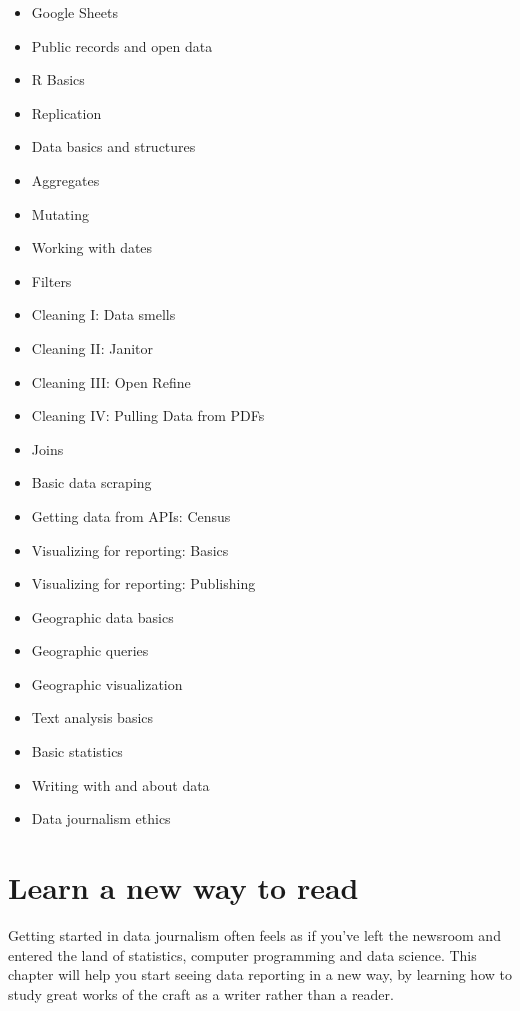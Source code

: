 \documentclass[
  letterpaper,
  DIV=11,
  numbers=noendperiod]{scrreprt}
\providecommand{\tightlist}{%
  \setlength{\itemsep}{0pt}\setlength{\parskip}{0pt}}\usepackage{longtable,booktabs,array}
\begin{document}
\begin{itemize}
\tightlist
\item
  Google Sheets
\item
  Public records and open data
\item
  R Basics
\item
  Replication
\item
  Data basics and structures
\item
  Aggregates
\item
  Mutating
\item
  Working with dates
\item
  Filters
\item
  Cleaning I: Data smells
\item
  Cleaning II: Janitor
\item
  Cleaning III: Open Refine
\item
  Cleaning IV: Pulling Data from PDFs
\item
  Joins
\item
  Basic data scraping
\item
  Getting data from APIs: Census
\item
  Visualizing for reporting: Basics
\item
  Visualizing for reporting: Publishing
\item
  Geographic data basics
\item
  Geographic queries
\item
  Geographic visualization
\item
  Text analysis basics
\item
  Basic statistics
\item
  Writing with and about data
\item
  Data journalism ethics
\end{itemize}


\hypertarget{start-story}{%
\chapter{Learn a new way to read}\label{start-story}}

Getting started in data journalism often feels as if you've left the
newsroom and entered the land of statistics, computer programming and
data science. This chapter will help you start seeing data reporting in
a new way, by learning how to study great works of the craft as a writer
rather than a reader.
\end{document}
